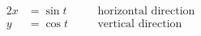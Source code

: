 \begin{alignat}{2}
  x &= \sin t & \quad & \text{horizontal direction} \\
  y &= \cos t && \text{vertical direction}
\end{alignat}